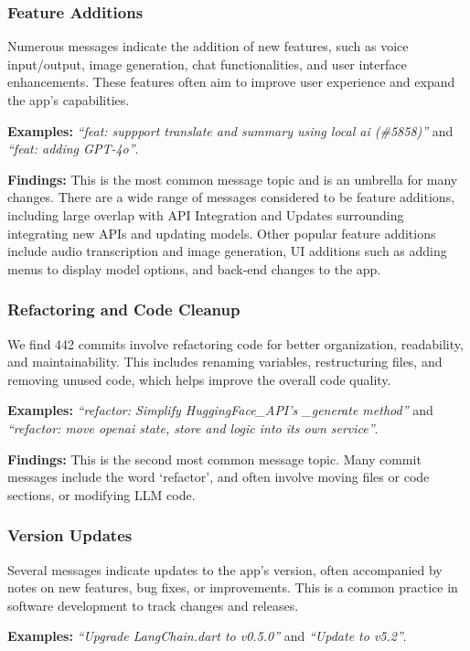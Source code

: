 
    
\subsubsection{Feature Additions}
Numerous messages indicate the addition of new features, such as voice input/output, image generation, chat functionalities, and user interface enhancements. These features often aim to improve user experience and expand the app's capabilities.

\textbf{Examples: } \textit{``feat: suppport translate and summary using local ai (\#5858)''} and \textit{``feat: adding GPT-4o''}.

\textbf{Findings: } This is the most common message topic and is an umbrella for many changes. There are a wide range of messages considered to be feature additions, including large overlap with API Integration and Updates surrounding integrating new APIs and updating models. Other popular feature additions include audio transcription and image generation, UI additions such as adding menus to display model options, and back-end changes to the app.

\subsubsection{Refactoring and Code Cleanup}
We find 442 commits involve refactoring code for better organization, readability, and maintainability. This includes renaming variables, restructuring files, and removing unused code, which helps improve the overall code quality.

\textbf{Examples: } \textit{``refactor: Simplify HuggingFace\_API's \_generate method''} and \textit{``refactor: move openai state, store and logic into its own service''}.

\textbf{Findings: } This is the second most common message topic. Many commit messages include the word `refactor', and often involve moving files or code sections, or modifying LLM code.

\subsubsection{Version Updates}
Several messages indicate updates to the app's version, often accompanied by notes on new features, bug fixes, or improvements. This is a common practice in software development to track changes and releases.

\textbf{Examples: } \textit{``Upgrade LangChain.dart to v0.5.0''} and \textit{``Update to v5.2''}.

